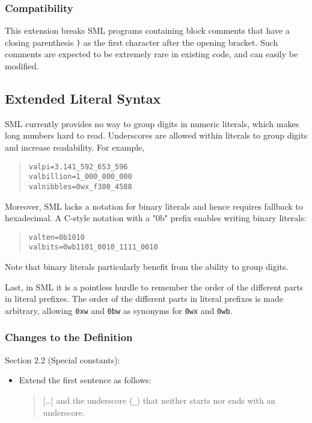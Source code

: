 \documentclass[twoside,titlepage]{article}
\begin{document}
\begin{appendix}
\subsubsection*{Compatibility}

This extension breaks SML programs containing block comments that have a closing parenthesis {\tt )} as the first character after the opening bracket. Such comments are expected to be extremely rare in existing code, and can easily be modified.


\subsection{Extended Literal Syntax}
\label{ext-literals}

SML currently provides no way to group digits in numeric literals, which makes long numbers hard to read.
Underscores are allowed within literals to group digits and increase readability. For example,
\begin{quote}
\begin{alltt}
val pi = 3.141_592_653_596
val billion = 1_000_000_000
val nibbles = 0wx_f300_4588
\end{alltt}
\end{quote}

Moreover, SML lacks a notation for binary literals and hence requires fallback to hexadecimal.
A C-style notation with a "0b" prefix enables writing binary literals:
\begin{quote}
\begin{alltt}
val ten = 0b1010
val bits = 0wb1101_0010_1111_0010
\end{alltt}
\end{quote}
Note that binary literals particularly benefit from the ability to group digits.

Last, in SML it is a pointless hurdle to remember the order of the different parts in literal prefixes.
The order of the different parts in literal prefixes is made arbitrary, allowing {\tt 0xw} and {\tt 0bw} as synonyms for {\tt 0wx} and {\tt 0wb}.

\subsubsection*{Changes to the Definition}

Section 2.2 (Special constants):
\begin{itemize}
\item Extend the first sentence as follows:
  \begin{quote}
  [\dots] and the underscore ({\tt \_}) that neither starts nor ends with an underscore.
  \end{quote}


\end{itemize}
\end{appendix}
\end{document}
